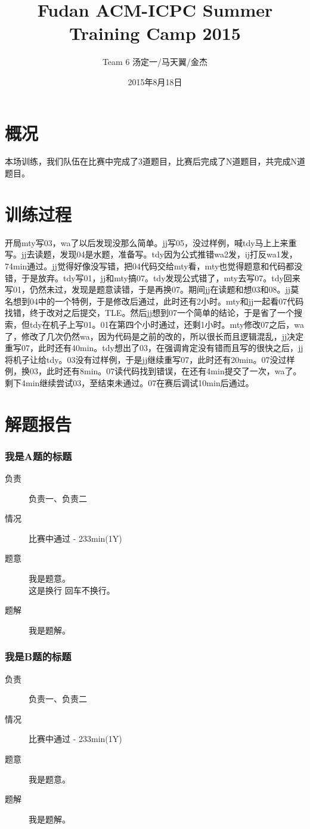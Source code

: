 \documentclass[a4paper, 11pt, nofonts, nocap, fancyhdr]{ctexart}
\title{Fudan ACM-ICPC Summer Training Camp 2015}
\author{Team 6 汤定一/马天翼/金杰}
\date{2015年8月18日}
\newcommand{\problem}[1]{\subsubsection{#1}}
\begin{document}
\maketitle

\section{概况}

本场训练，我们队伍在比赛中完成了3道题目，比赛后完成了N道题目，共完成N道题目。

\section{训练过程}

开局mty写03，wa了以后发现没那么简单。jj写05，没过样例，喊tdy马上上来重写。jj去读题，发现04是水题，准备写。tdy因为公式推错wa2发，ij打反wa1发，74min通过。jj觉得好像没写错，把04代码交给mty看，mty也觉得题意和代码都没错，于是放弃。tdy写01，jj和mty搞07。tdy发现公式错了，mty去写07。tdy回来写01，仍然未过，发现是题意读错，于是再换07。期间jj在读题和想03和08。jj莫名想到04中的一个特例，于是修改后通过，此时还有2小时。mty和jj一起看07代码找错，终于改对之后提交，TLE。然后jj想到07一个简单的结论，于是省了一个搜索，但tdy在机子上写01。01在第四个小时通过，还剩1小时。mty修改07之后，wa了，修改了几次仍然wa，因为代码是之前的改的，所以很长而且逻辑混乱，jj决定重写07，此时还有40min。tdy想出了03，在强调肯定没有错而且写的很快之后，jj将机子让给tdy。03没有过样例，于是jj继续重写07，此时还有20min。07没过样例，换03，此时还有8min。07读代码找到错误，在还有4min提交了一次，wa了。剩下4min继续尝试03，至结束未通过。07在赛后调试10min后通过。

\section{解题报告}

\problem{我是A题的标题}

\begin{description}
\item[负责] 负责一、负责二
\item[情况] 比赛中通过 - 233min(1Y)
\item[题意]
我是题意。\\这是换行
回车不换行。
\item[题解]
我是题解。
\end{description}

\problem{我是B题的标题}

\begin{description}
\item[负责] 负责一、负责二
\item[情况] 比赛中通过 - 233min(1Y)
\item[题意]
我是题意。
\item[题解]
我是题解。
\end{description}
\end{document}
